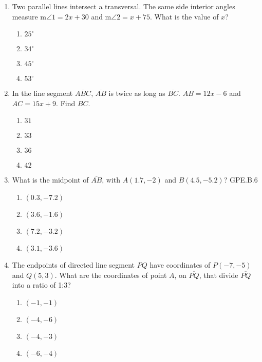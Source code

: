 \documentclass[12pt, twoside]{article}
\begin{document}
\begin{enumerate}
\item Two parallel lines intersect a transversal. The same side interior angles measure m$\angle 1 = 2x+30$ and m$\angle 2 = x+75$. What is the value of $x$?
\begin{multicols}{2}
  \begin{enumerate}
    \item $25^\circ$
    \item $34^\circ$
    \item $45^\circ$
    \item $53^\circ$
  \end{enumerate}
  \end{multicols}

\newpage
\item In the line segment $\overline{ABC}$, $\overline{AB}$ is twice as long as $\overline{BC}$. $AB=12x-6$ and $AC=15x+9$. Find $BC$.
  \begin{multicols}{2}
  \begin{enumerate}
    \item $31$
    \item $33$
    \item $36$
    \item $42$
  \end{enumerate}
  \end{multicols} \vspace{1cm}

\item What is the midpoint of $\overline{AB}$, with $A(1.7,-2)$ and $B(4.5,-5.2)$? \hfill GPE.B.6
\begin{multicols}{2}
  \begin{enumerate}
    \item $(0.3,-7.2)$
    \item $(3.6,-1.6)$
    \item $(7.2,-3.2)$
    \item $(3.1,-3.6)$
  \end{enumerate}
  \end{multicols} \vspace{1cm}

\item The endpoints of directed line segment $PQ$ have coordinates of $P(-7,-5)$ and $Q(5,3)$. What are the coordinates of point $A$, on $\overline{PQ}$, that divide $\overline{PQ}$ into a ratio of 1:3?
\begin{multicols}{2}
  \begin{enumerate}
    \item $(-1,-1)$
    \item $(-4,-6)$
    \item $(-4,-3)$
    \item $(-6,-4)$
  \end{enumerate}
  \end{multicols} \vspace{2cm}


\end{enumerate}
\end{document}
